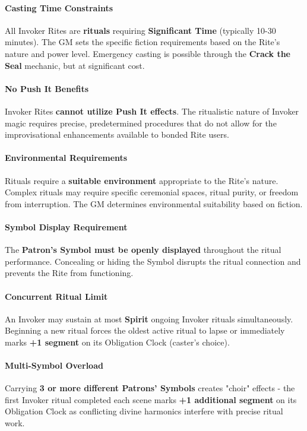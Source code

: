 \documentclass[12pt,twoside]{book}
\begin{document}
\paragraph{Casting Time Constraints} All Invoker Rites are \textbf{rituals} requiring \textbf{Significant Time} (typically 10-30 minutes). The GM sets the specific fiction requirements based on the Rite's nature and power level. Emergency casting is possible through the \textbf{Crack the Seal} mechanic, but at significant cost.

\paragraph{No Push It Benefits} Invoker Rites \textbf{cannot utilize Push It effects}. The ritualistic nature of Invoker magic requires precise, predetermined procedures that do not allow for the improvisational enhancements available to bonded Rite users.

\paragraph{Environmental Requirements} Rituals require a \textbf{suitable environment} appropriate to the Rite's nature. Complex rituals may require specific ceremonial spaces, ritual purity, or freedom from interruption. The GM determines environmental suitability based on fiction.

\paragraph{Symbol Display Requirement} The \textbf{Patron's Symbol must be openly displayed} throughout the ritual performance. Concealing or hiding the Symbol disrupts the ritual connection and prevents the Rite from functioning.

\paragraph{Concurrent Ritual Limit} An Invoker may sustain at most \textbf{Spirit} ongoing Invoker rituals simultaneously. Beginning a new ritual forces the oldest active ritual to lapse or immediately marks \textbf{+1 segment} on its Obligation Clock (caster's choice).

\paragraph{Multi-Symbol Overload} Carrying \textbf{3 or more different Patrons' Symbols} creates "choir" effects - the first Invoker ritual completed each scene marks \textbf{+1 additional segment} on its Obligation Clock as conflicting divine harmonics interfere with precise ritual work.
\end{document}
